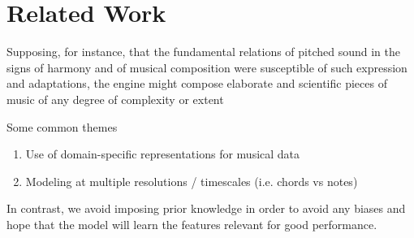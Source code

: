 \chapter{Related Work}
\begin{savequote}[75mm]
  Supposing, for instance, that the fundamental relations of pitched sound in the
  signs of harmony and of musical composition were susceptible of such expression and
  adaptations, the engine might compose elaborate and scientific pieces of music
  of any degree of complexity or extent
\end{savequote}




\ifpdf
    \graphicspath{{Chapter3/Figs/Raster/}{Chapter3/Figs/PDF/}{Chapter3/Figs/}}
\else
    \graphicspath{{Chapter3/Figs/Vector/}{Chapter3/Figs/}}
\fi

Some common themes
\begin{enumerate}
  \item Use of domain-specific representations for musical data
  \item Modeling at multiple resolutions / timescales (i.e. chords vs notes)
\end{enumerate}
In contrast, we avoid imposing prior knowledge in order to avoid any biases
and hope that the model will learn the features relevant for good performance.

